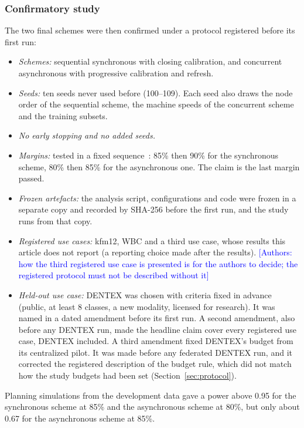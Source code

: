 \documentclass[pdflatex,sn-mathphys-num]{sn-jnl}
\newcommand{\authornote}[1]{\textcolor{blue}{[Authors: #1]}}
\begin{document}
\subsubsection{Confirmatory study}\label{sec:confirm}
The two final schemes were then confirmed under a protocol registered before its first run:
\begin{itemize}
\item \emph{Schemes:} sequential synchronous with closing calibration, and concurrent asynchronous with progressive calibration and refresh.
\item \emph{Seeds:} ten seeds never used before (100--109). Each seed also draws the node order of the sequential scheme, the machine speeds of the concurrent scheme and the training subsets.
\item \emph{No early stopping and no added seeds.}
\item \emph{Margins:} tested in a fixed sequence~\cite{wiens2003fixed}: 85\% then 90\% for the synchronous scheme, 80\% then 85\% for the asynchronous one. The claim is the last margin passed.
\item \emph{Frozen artefacts:} the analysis script, configurations and code were frozen in a separate copy and recorded by SHA-256 before the first run, and the study runs from that copy.
\item \emph{Registered use cases:} kfm12, WBC and a third use case, whose results this article does not report (a reporting choice made after the results). \authornote{how the third registered use case is presented is for the authors to decide; the registered protocol must not be described without it}
\item \emph{Held-out use case:} DENTEX was chosen with criteria fixed in advance (public, at least 8 classes, a new modality, licensed for research). It was named in a dated amendment before its first run. A second amendment, also before any DENTEX run, made the headline claim cover every registered use case, DENTEX included. A third amendment fixed DENTEX's budget from its centralized pilot. It was made before any federated DENTEX run, and it corrected the registered description of the budget rule, which did not match how the study budgets had been set (Section~\ref{sec:protocol}).
\end{itemize}
Planning simulations from the development data gave a power above 0.95 for the synchronous scheme at 85\% and the asynchronous scheme at 80\%, but only about 0.67 for the asynchronous scheme at 85\%.
\end{document}
